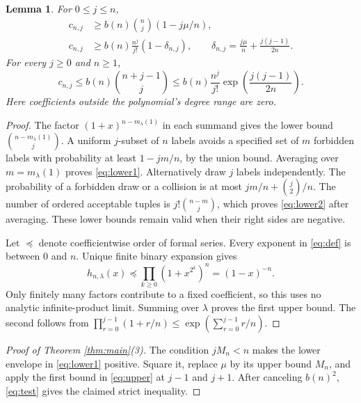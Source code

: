 \documentclass[11pt]{article}
\newtheorem{lemma}[theorem]{Lemma}
\begin{document}
\begin{lemma}\label{lem:envelopes}
For $0\le j\le n$,
\begin{align}
 c_{n,j}&\ge b(n)\binom nj(1-j\mu/n),\label{eq:lower1}\\
 c_{n,j}&\ge b(n)\frac{n^j}{j!}(1-\delta_{n,j}),\qquad
 \delta_{n,j}=\frac{j\mu}{n}+\frac{j(j-1)}{2n}.\label{eq:lower2}
\end{align}
For every $j\ge0$ and $n\ge1$,
\begin{equation}\label{eq:upper}
 c_{n,j}\le b(n)\binom{n+j-1}{j}
 \le b(n)\frac{n^j}{j!}\exp\left(\frac{j(j-1)}{2n}\right).
\end{equation}
Here coefficients outside the polynomial's degree range are zero.
\end{lemma}
\begin{proof}
The factor $(1+x)^{n-m_\lambda(1)}$ in each summand gives the lower bound
$\binom{n-m_\lambda(1)}j$. A uniform $j$-subset of $n$ labels avoids a
specified set of $m$ forbidden labels with probability at least $1-jm/n$,
by the union bound. Averaging over $m=m_\lambda(1)$ proves
\eqref{eq:lower1}. Alternatively draw $j$ labels independently. The
probability of a forbidden draw or a collision is at most
$jm/n+\binom j2/n$. The number of ordered acceptable tuples is
$j!\binom{n-m}j$, which proves \eqref{eq:lower2} after averaging.
These lower bounds remain valid when their right sides are negative.

Let $\preceq$ denote coefficientwise order of formal series. Every exponent
in \eqref{eq:def} is between $0$ and $n$. Unique finite binary expansion gives
\[
 h_{n,\lambda}(x)\preceq
 \prod_{k\ge0}(1+x^{2^k})^n=(1-x)^{-n}.
\]
Only finitely many factors contribute to a fixed coefficient, so this uses
no analytic infinite-product limit. Summing over $\lambda$ proves the first
upper bound. The second follows from
$\prod_{r=0}^{j-1}(1+r/n)\le\exp(\sum_{r=0}^{j-1}r/n)$.
\end{proof}

\begin{proof}[Proof of Theorem \ref{thm:main}(3)]
The condition $jM_n<n$ makes the lower envelope in \eqref{eq:lower1}
positive. Square it, replace $\mu$ by its upper bound $M_n$, and apply the
first bound in \eqref{eq:upper} at $j-1$ and $j+1$.
After canceling $b(n)^2$, \eqref{eq:test} gives the claimed strict inequality.
\end{proof}
\end{document}

